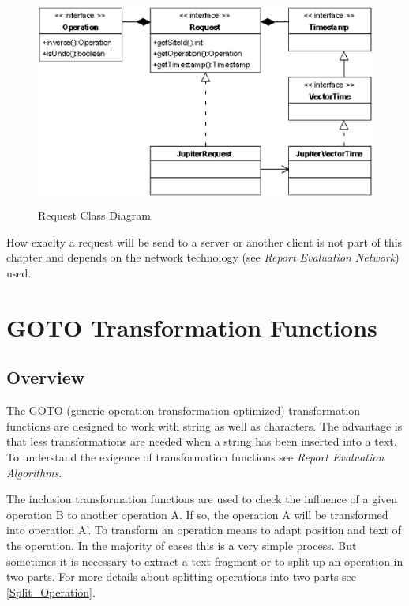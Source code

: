 \begin{figure}[H]
\centering
\includegraphics[height=6.87cm,width=12.09cm]{../../images/algo-impl/request_classdiagram.eps}
\caption{Request Class Diagram}
\label{Request Class Diagram}
\end{figure}

How exaclty a request will be send to a server or another client is not part of this chapter and depends on the network technology (see \emph{Report Evaluation Network}) used.


\section{GOTO Transformation Functions}

\subsection{Overview}
The GOTO (generic operation transformation optimized) transformation functions are designed to work with string as well as characters. The advantage is that less transformations are needed when a string has been inserted into a text. To understand the exigence of transformation functions see \emph{Report Evaluation Algorithms}.

The inclusion transformation functions are used to check the influence of a given operation B to another operation A. If so, the operation A will be transformed into operation A'. To transform an operation means to adapt position and text of the operation. In the majority of cases this is a very simple process. But sometimes it is necessary to extract a text fragment or to split up an operation in two parts. For more details about splitting operations into two parts see \ref{Split_Operation}.

